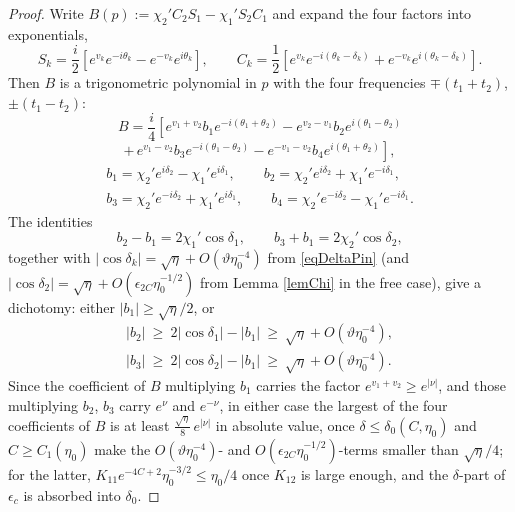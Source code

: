 \documentclass[11pt,twoside,reqno]{amsart}
\def\d{\delta}
\theoremstyle{plain}
\numberwithin{equation}{section}
\begin{document}
\begin{proof}
Write $B(p):=\chi_2'C_2S_1-\chi_1'S_2C_1$ and expand the four factors into exponentials,
$$S_k=\frac i2\left[e^{v_k}e^{-i\theta_k}-e^{-v_k}e^{i\theta_k}\right],\qquad
C_k=\frac 12\left[e^{v_k}e^{-i(\theta_k-\d_k)}+e^{-v_k}e^{i(\theta_k-\d_k)}\right].$$
Then $B$ is a trigonometric polynomial in $p$ with the four frequencies $\mp(t_1+t_2)$, $\pm(t_1-t_2)$:
$$B=\frac i4\left[e^{v_1+v_2}b_1e^{-i(\theta_1+\theta_2)}-e^{v_2-v_1}b_2e^{i(\theta_1-\theta_2)}\right.$$
$$\left.+\,e^{v_1-v_2}b_3e^{-i(\theta_1-\theta_2)}-e^{-v_1-v_2}b_4e^{i(\theta_1+\theta_2)}\right],$$
$$\begin{gathered}b_1=\chi_2'e^{i\d_2}-\chi_1'e^{i\d_1},\qquad b_2=\chi_2'e^{i\d_2}+\chi_1'e^{-i\d_1},\\
b_3=\chi_2'e^{-i\d_2}+\chi_1'e^{i\d_1},\qquad b_4=\chi_2'e^{-i\d_2}-\chi_1'e^{-i\d_1}.\end{gathered}$$
The identities
$$b_2-b_1=2\chi_1'\cos\d_1,\qquad b_3+b_1=2\chi_2'\cos\d_2,$$
together with $|\cos\d_k|=\sqrt\eta+O(\vartheta\eta_0^{-4})$ from \eqref{eqDeltaPin} (and $|\cos\d_2|=\sqrt\eta+O(\epsilon_{2C}\eta_0^{-1/2})$ from Lemma \ref{lemChi} in the free case), give a dichotomy: either $|b_1|\geq\sqrt\eta/2$, or
$$\begin{gathered}|b_2|\ \geq\ 2|\cos\d_1|-|b_1|\ \geq\ \sqrt\eta+O(\vartheta\eta_0^{-4}),\\
|b_3|\ \geq\ 2|\cos\d_2|-|b_1|\ \geq\ \sqrt\eta+O(\vartheta\eta_0^{-4}).\end{gathered}$$
Since the coefficient of $B$ multiplying $b_1$ carries the factor $e^{v_1+v_2}\geq e^{|\nu|}$, and those multiplying $b_2$, $b_3$ carry $e^{\nu}$ and $e^{-\nu}$, in either case the largest of the four coefficients of $B$ is at least $\frac{\sqrt\eta}{8}\,e^{|\nu|}$ in absolute value, once $\d\leq\d_0(C,\eta_0)$ and $C\geq C_1(\eta_0)$ make the $O(\vartheta\eta_0^{-4})$- and $O(\epsilon_{2C}\eta_0^{-1/2})$-terms smaller than $\sqrt\eta/4$; for the latter, $K_{11}e^{-4C+2}\eta_0^{-3/2}\leq\eta_0/4$ once $K_{12}$ is large enough, and the $\d$-part of $\epsilon_c$ is absorbed into $\d_0$.


\end{proof}
\end{document}
